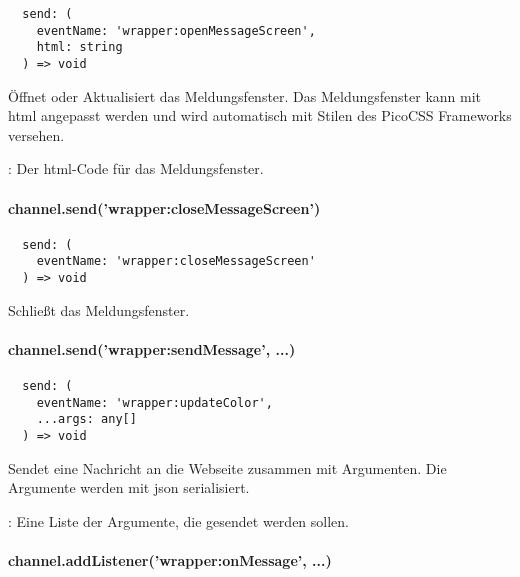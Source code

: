 \begin{verbatim}
  send: (
    eventName: 'wrapper:openMessageScreen',
    html: string
  ) => void
\end{verbatim}

Öffnet oder Aktualisiert das Meldungsfenster.
Das Meldungsfenster kann mit \ac{html} angepasst werden und wird automatisch mit Stilen des PicoCSS Frameworks versehen.

\begin{arguments}
  \item {}: Der \ac{html}-Code für das Meldungsfenster.
\end{arguments}


\paragraph{channel.send('wrapper:closeMessageScreen')}

\begin{verbatim}
  send: (
    eventName: 'wrapper:closeMessageScreen'
  ) => void
\end{verbatim}

Schließt das Meldungsfenster.


\paragraph{channel.send('wrapper:sendMessage', ...)}

\begin{verbatim}
  send: (
    eventName: 'wrapper:updateColor',
    ...args: any[]
  ) => void
\end{verbatim}

Sendet eine Nachricht an die Webseite zusammen mit Argumenten.
Die Argumente werden mit \ac{json} serialisiert.

\begin{arguments}
  \item {}: Eine Liste der Argumente, die gesendet werden sollen.
\end{arguments}


\paragraph{channel.addListener('wrapper:onMessage', ...)}


